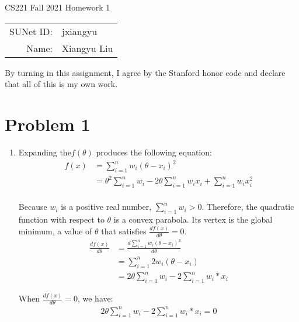 \documentclass[12pt]{article}
\begin{document}
\begin{center}
{\Large CS221 Fall 2021 Homework 1}

\begin{tabular}{rl}
SUNet ID: & jxiangyu \\
Name: & Xiangyu Liu \\
\end{tabular}
\end{center}

By turning in this assignment, I agree by the Stanford honor code and declare
that all of this is my own work.

\section*{Problem 1}
\begin{enumerate}[label=(\alph*)]
\item
Expanding the\(f(\theta)\) produces the following equation:
\begin{equation}
\begin{split}
  f(x) &= \sum_{i=1}^{n}w_i(\theta - x_i)^2 \\
    &= \theta^2\sum_{i=1}^{n}w_i - 2\theta \sum_{i=1}^{n}w_i x_i + \sum_{i=1}^{n}w_i x_i^2 \\
\end{split}
\end{equation}

Because \(w_i\) is a positive real number, \(\sum_{i=1}^{n}w_i > 0\). Therefore, the quadratic function with respect to \(\theta\) is a convex parabola. Its vertex is the global minimum, a value of \(\theta\) that satisfies \( \frac {df(x)}{d\theta} = 0\).
\begin{equation}
\begin{split}
  \frac {df(x)}{d\theta} &= \frac {d{\sum_{i=1}^{n}w_i(\theta - x_i)^2}}{d\theta} \\
  &= \sum_{i=1}^{n}2w_i(\theta - x_i) \\
  &= 2\theta \sum_{i=1}^{n}w_i - 2 \sum_{i=1}^{n}w_i*x_i
\end{split}
\end{equation}

When \( \frac {df(x)}{d\theta}=0\), we have:
\begin{equation}
\begin{split}
  2\theta \sum_{i=1}^{n}w_i - 2 \sum_{i=1}^{n}w_i*x_i = 0 \\
\end{split}
\end{equation}


\end{enumerate}
\end{document}
